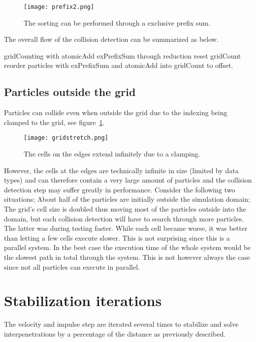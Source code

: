 \begin{figure}[H]
  \centering
  \texttt{[image: prefix2.png]}
  \caption{The sorting can be performed through a exclusive prefix sum.}
\end{figure}

The overall flow of the collision detection can be summarized as below.

\begin{algorithm}[H]
  \begin{algorithmic}[1]
  \State gridCounting with atomicAdd
  \State exPrefixSum through reduction
  \State reset gridCount
  \State reorder particles with exPrefixSum and atomicAdd into gridCount to offset.
  \end{algorithmic}
\end{algorithm}

\subsection{Particles outside the grid}
Particles can collide even when outside the grid due to the indexing
being clamped to the grid, see figure~\ref{fig:gridStretch}.

\begin{figure}[H]
  \centering
  \texttt{[image: gridstretch.png]}
  \caption{The cells on the edges extend infinitely due to a clamping.\label{fig:gridStretch}}
\end{figure}

However, the cells at the edges are technically infinite
in size (limited by data types) and can therefore contain a very large amount of particles and the collision
detection step may suffer greatly in performance. Consider the following two situations;
About half of the particles are initially outside the simulation domain; The grid's
cell size is doubled thus moving most of the particles outside into the domain, but
each collision detection will have to search through more particles.
The latter was during testing faster. While each cell became worse, it was better
than letting a few cells execute slower. This is not surprising since this is a
parallel system. In the best case the execution time of the whole system would be
the slowest path in total through the system. This is not however always the case
since not all particles can execute in parallel.

\section{Stabilization iterations}
The velocity and impulse step are iterated several times to stabilize and solve
interpenetrations by a percentage of the distance as previously described.

